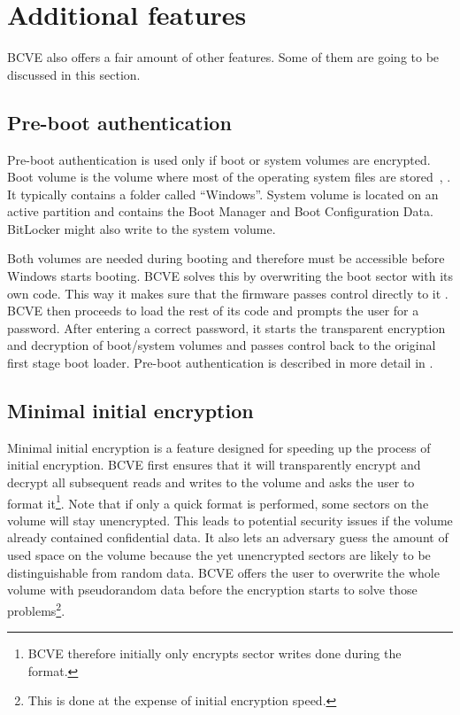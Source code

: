 \documentclass[thesis=B,english]{FITthesis}[2012/10/20]
\begin{document}
	\section{Additional features}
	
	BCVE also offers a fair amount of other features. Some of them are going to be discussed in this section.
	
	\subsection{Pre-boot authentication}
	
	Pre-boot authentication is used only if boot or system volumes are encrypted. Boot volume is the volume where most of the operating system files are stored~\cite{system_boot}, \cite{russinovich}. It typically contains a folder called ``Windows''. System volume is located on an active partition and contains the Boot Manager and Boot Configuration Data. BitLocker might also write to the system volume. 
	
	Both volumes are needed during booting and therefore must be accessible before Windows starts booting. BCVE solves this by overwriting the boot sector with its own code. This way it makes sure that the firmware passes control directly to it \cite{ibm_booting}. BCVE then proceeds to load the rest of its code and prompts the user for a password. After entering a correct password, it starts the transparent encryption and decryption of boot/system volumes and passes control back to the original first stage boot loader. Pre-boot authentication is described in more detail in \cite{hornak}.
	
	\subsection{Minimal initial encryption}
	\label{subsec:minimal}
	
	Minimal initial encryption is a feature designed for speeding up the process of initial encryption. BCVE first ensures that it will transparently encrypt and decrypt all subsequent reads and writes to the volume and asks the user to format it\footnote{BCVE therefore initially only encrypts sector writes done during the format.}. Note that if only a quick format is performed, some sectors on the volume will stay unencrypted. This leads to potential security issues if the volume already contained confidential data. It also lets an adversary guess the amount of used space on the volume \cite{bcve_help} because the yet unencrypted sectors are likely to be distinguishable from random data. BCVE offers the user to overwrite the whole volume with pseudorandom data before the encryption starts to solve those problems\footnote{This is done at the expense of initial encryption speed.}.
	
\end{document}
